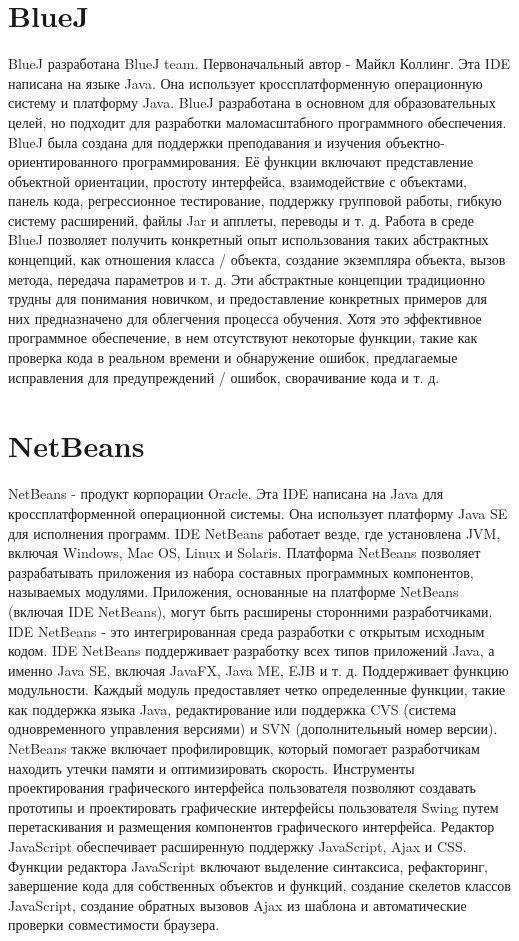 \section{BlueJ}
BlueJ разработана BlueJ team. Первоначальный автор - Майкл Коллинг. Эта IDE написана на языке Java. 
Она использует кроссплатформенную операционную систему и платформу Java. BlueJ разработана в 
основном для образовательных целей, но подходит для разработки маломасштабного программного 
обеспечения. BlueJ была создана для поддержки преподавания и изучения объектно-ориентированного
программирования. Её функции включают представление объектной ориентации, простоту интерфейса,
взаимодействие с объектами, панель кода, регрессионное тестирование, поддержку групповой работы, 
гибкую систему расширений, файлы Jar и апплеты, переводы и т. д. Работа в среде BlueJ позволяет
получить конкретный опыт использования таких абстрактных концепций, как отношения класса / объекта,
создание экземпляра объекта, вызов метода, передача параметров и т. д. Эти абстрактные концепции
традиционно трудны для понимания новичком, и предоставление конкретных примеров для них 
предназначено для облегчения процесса обучения. Хотя это эффективное программное обеспечение, в нем отсутствуют некоторые функции, такие как проверка кода в реальном времени и обнаружение ошибок,
предлагаемые исправления для предупреждений / ошибок, сворачивание кода и т. д.\\

\section{NetBeans}
NetBeans - продукт корпорации Oracle. Эта IDE написана на Java для кроссплатформенной операционной 
системы. Она использует платформу Java SE для исполнения программ. IDE NetBeans работает везде, 
где установлена JVM, включая Windows, Mac OS, Linux и Solaris. Платформа NetBeans позволяет 
разрабатывать приложения из набора составных программных компонентов, называемых модулями. 
Приложения, основанные на платформе NetBeans (включая IDE NetBeans), могут быть расширены 
сторонними разработчиками. IDE NetBeans - это интегрированная среда разработки с открытым исходным 
кодом. IDE NetBeans поддерживает разработку всех типов приложений Java, а именно Java SE, включая 
JavaFX, Java ME, EJB и т. д. Поддерживает функцию модульности. Каждый модуль предоставляет четко
определенные функции, такие как поддержка языка Java, редактирование или поддержка CVS (система
одновременного управления версиями) и SVN (дополнительный номер версии). NetBeans также включает 
профилировщик, который помогает разработчикам находить утечки памяти и оптимизировать скорость. 
Инструменты проектирования графического интерфейса пользователя позволяют создавать прототипы и
проектировать графические интерфейсы пользователя Swing путем перетаскивания и размещения 
компонентов графического интерфейса. Редактор JavaScript обеспечивает расширенную поддержку 
JavaScript, Ajax и CSS. Функции редактора JavaScript включают выделение синтаксиса, рефакторинг, 
завершение кода для собственных объектов и функций, создание скелетов классов JavaScript, 
создание обратных вызовов Ajax из шаблона и автоматические проверки совместимости браузера.\\

